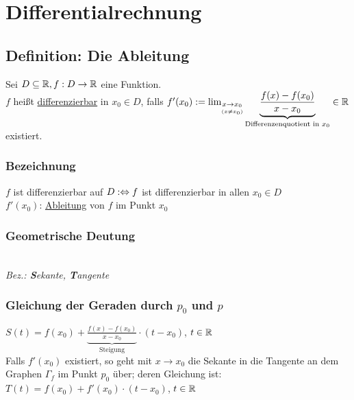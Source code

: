 \chapter{Differentialrechnung}\label{P11}
\section{Definition: Die Ableitung}\label{11.1}
Sei $D \subseteq \mathbb{R}, f: D \to \mathbb{R}$ eine Funktion.\\
$f$ heißt \underline{differenzierbar} in $x_0 \in D$, falls $f'(x_0) := \lim_{\underset{(x \neq x_0)}{x \to x_0}} \underbrace{\frac{f(x)-f(x_0)}{x-x_0}}_{\text{Differenzenquotient in } x_0} \in \mathbb{R}$ existiert.

\subsection*{Bezeichnung}
$f$ ist differenzierbar auf $D :\Leftrightarrow f$ ist differenzierbar in allen $x_0 \in D$\\
$f'(x_0)$: \underline{Ableitung} von $f$ im Punkt $x_0$

\subsection*{Geometrische Deutung}
\\
\emph{Bez.: \textbf{S}ekante, \textbf{T}angente}

\subsection*{Gleichung der Geraden durch $p_0$ und $p$}
$S(t) = f(x_0) + \underbrace{\frac{f(x)-f(x_0)}{x-x_0}}_{\text{Steigung}} \cdot (t-x_0)$, $t \in \mathbb{R}$\\
Falls $f'(x_0)$ existiert, so geht mit $x \to x_0$ die Sekante in die Tangente an dem Graphen $\Gamma_f$ im Punkt $p_0$ über; deren Gleichung ist:\\
$T(t)=f(x_0)+f'(x_0) \cdot (t-x_0)$, $t \in \mathbb{R}$

\newpage

